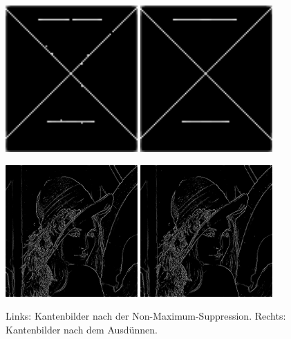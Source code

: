 \documentclass[a4paper, 11pt]{report}
\theoremstyle{definition}
\begin{document}
			\begin{figure}[H]\centering
				\includegraphics[width=0.45\textwidth]{./assets/thinout/out_nonmax_supp.png}\quad
				\includegraphics[width=0.45\textwidth]{./assets/thinout/out_thinned.png}

				\vspace{0.5em}

				\includegraphics[width=0.45\textwidth]{../examples/lena/15_out_nonmax_supp.png}\quad
				\includegraphics[width=0.45\textwidth]{../examples/lena/15_out_thinned.png}
				\caption{Links: Kantenbilder nach der Non-Maximum-Suppression. Rechts: Kantenbilder nach dem Ausdünnen.}
				\label{fig:thinout_test}
			\end{figure}
\end{document}

